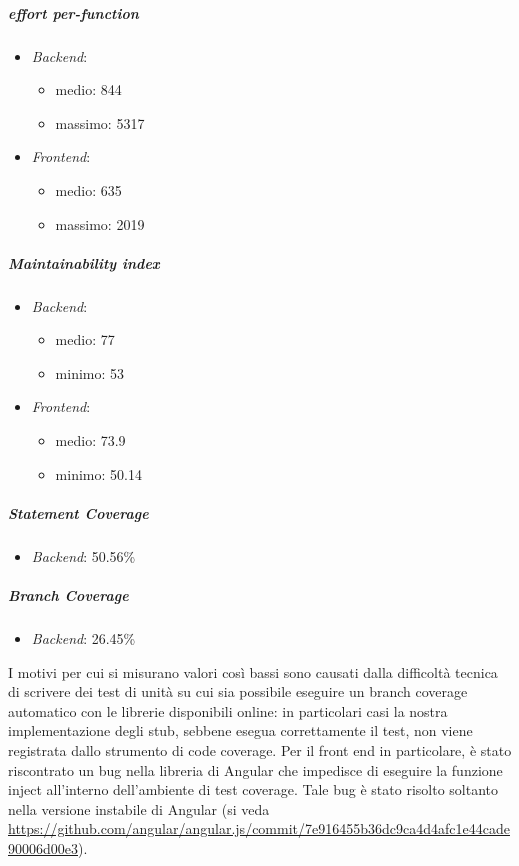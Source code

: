 	\subparagraph{ effort per-function}
	\begin{itemize}
		\item \emph{Backend}: 
		\begin{itemize}
			\item medio: 844
			\item massimo: 5317
		\end{itemize}
		\item \emph{Frontend}: 
		\begin{itemize}
			\item medio: 635
			\item massimo: 2019
		\end{itemize} 
	\end{itemize}


	\subparagraph{Maintainability index}
	\begin{itemize}
		\item \emph{Backend}: 
		\begin{itemize}
			\item medio: 77
			\item minimo: 53
		\end{itemize} 
		\item \emph{Frontend}: 
		\begin{itemize}
			\item medio: 73.9
			\item minimo: 50.14
		\end{itemize} 
	\end{itemize}


	\subparagraph{Statement Coverage}
	\begin{itemize}
		\item \emph{Backend}: 50.56\%
	\end{itemize}
	

	\subparagraph{Branch Coverage}
	\begin{itemize}
		\item \emph{Backend}: 26.45\%
	\end{itemize}

	I motivi per cui si misurano valori così bassi sono causati dalla difficoltà tecnica di scrivere dei test di unità su cui sia possibile eseguire un branch coverage automatico con le librerie disponibili online: in particolari casi la nostra implementazione degli stub, sebbene esegua correttamente il test, non viene registrata dallo strumento di code coverage.
	Per il front end in particolare, è stato riscontrato un bug nella libreria di Angular che impedisce di eseguire la funzione inject all'interno dell'ambiente di test coverage. Tale bug è stato risolto soltanto nella versione instabile di Angular (si veda \url{https://github.com/angular/angular.js/commit/7e916455b36dc9ca4d4afc1e44cade90006d00e3}).


